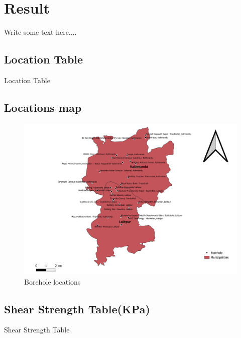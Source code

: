 \chapter{Result}
Write some text here....
\pagebreak

\section{Location Table}
\begin{table}[!h]
\caption{Location Table}

\end{table}
\pagebreak

\section{Locations map}
\begin{figure}[!hbt]
\centering
\includegraphics[width=\linewidth, height=\textheight,keepaspectratio]{in/map/Borehole2.png}
\caption{Borehole locations}
\end{figure}
\pagebreak

\section{Shear Strength Table(KPa)}
\begin{table}[!h]
\caption{Shear Strength Table}

\end{table}
\pagebreak

